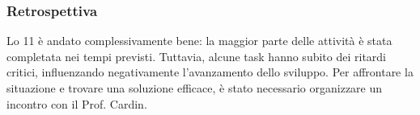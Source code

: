 \subsubsection{Retrospettiva}
\label{sec:retrospettiva_sprint11}

Lo  11 è andato complessivamente bene: la maggior parte delle attività è stata completata nei tempi previsti. 
Tuttavia, alcune task hanno subito dei ritardi critici, influenzando negativamente l'avanzamento dello sviluppo. 
Per affrontare la situazione e trovare una soluzione efficace, è stato necessario organizzare un incontro con il Prof. Cardin.
